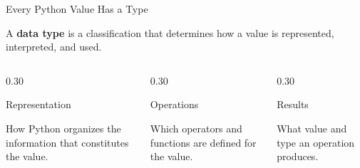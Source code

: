 \documentclass[aspectratio=169,10pt]{beamer}
\begin{document}
\begin{frame}{Every Python Value Has a Type}

  \begin{cpdefinition}

    A \textbf{data type} is a classification that determines how a value is represented, interpreted, and used.

  \end{cpdefinition}

  \begin{columns}[T,onlytextwidth]

    \begin{column}{0.30\textwidth}

      \begin{block}{Representation}

        How Python organizes the information that constitutes the value.

      \end{block}

    \end{column}

    \begin{column}{0.30\textwidth}

      \begin{block}{Operations}

        Which operators and functions are defined for the value.

      \end{block}

    \end{column}

    \begin{column}{0.30\textwidth}

      \begin{block}{Results}

        What value and type an operation produces.

      \end{block}

    \end{column}

  \end{columns}

\end{frame}
\end{document}
